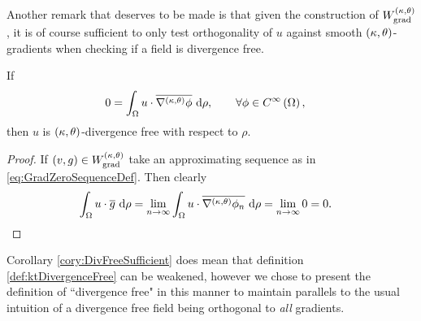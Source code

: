 Another remark that deserves to be made is that given the construction of $W^{\left( \kappa, \theta \right)}_{\mathrm{grad}}$, it is of course sufficient to only test orthogonality of $u$ against smooth $\left( \kappa, \theta \right)$-gradients when checking if a field is divergence free.
\begin{cory} \label{cory:DivFreeSufficient}
	If
	\begin{align*}
		0 &= \int_{\Omega} u\cdot\overline{\nabla^{\left( \kappa, \theta \right)}\phi}  \ \mathrm{d}\rho, \qquad\forall\phi\in C^{\infty}\left( \Omega \right),
	\end{align*}
	then $u$ is $\left( \kappa, \theta \right)$-divergence free with respect to $\rho$.
\end{cory}
\begin{proof}
	If $\left( v,g \right)\in W^{\left( \kappa, \theta \right)}_{\mathrm{grad}}$ take an approximating sequence as in \eqref{eq:GradZeroSequenceDef}.
	Then clearly
	\begin{align*}
		\int_{\Omega} u\cdot\overline{g}  \ \mathrm{d}\rho 
		&= \lim_{n\rightarrow\infty}\int_{\Omega} u\cdot\overline{\nabla^{\left( \kappa, \theta \right)}\phi_n}  \ \mathrm{d}\rho
		= \lim_{n\rightarrow\infty} 0 = 0.
	\end{align*}
\end{proof}
Corollary \ref{cory:DivFreeSufficient} does mean that definition \ref{def:ktDivergenceFree} can be weakened, however we chose to present the definition of ``divergence free" in this manner to maintain parallels to the usual intuition of a divergence free field being orthogonal to \emph{all} gradients.
